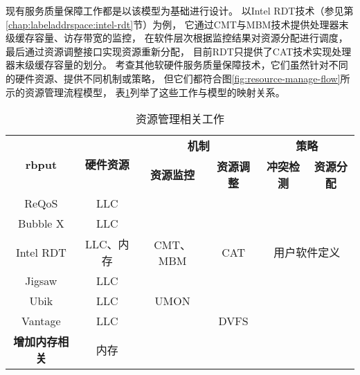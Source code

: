 
现有服务质量保障工作都是以该模型为基础进行设计。
以Intel RDT技术（参见第\ref{chap:labeladdrspace:intel-rdt}节）为例，
它通过CMT与MBM技术提供处理器末级缓存容量、访存带宽的监控，
在软件层次根据监控结果对资源分配进行调度，
最后通过资源调整接口实现资源重新分配，
目前RDT只提供了CAT技术实现处理器末级缓存容量的划分。
考查其他软硬件服务质量保障技术\cite{}，它们虽然针对不同的硬件资源、提供不同机制或策略，
但它们都符合图\ref{fig:resource-manage-flow}所示的资源管理流程模型，
表\ref{tab:resman-compare}列举了这些工作与模型的映射关系。


\begin{table}[htb]
  \centering
  \begin{minipage}[t]{0.95\linewidth}
  \caption{资源管理相关工作}
  \label{tab:resman-compare}
    \begin{tabular*}{\linewidth}{cccccc}
      \toprule[1.5pt]
      \multirow{2}{*}{\textbf{rbput}} & \multirow{2}{*}{\textbf{硬件资源}} & \multicolumn{2}{c}{\textbf{机制}}     & \multicolumn{2}{c}{\textbf{策略}}     \\
                                      &                                    & \textbf{资源监控} & \textbf{资源调整} & \textbf{冲突检测} & \textbf{资源分配} \\
      \midrule[1pt]
      ReQoS\cite{}                    & LLC                                &                   &                   &                   &                   \\
      Bubble X\cite{}                 & LLC                                &                   &                   &                   &                   \\
      \hline
      Intel RDT\cite{}                & LLC、内存                          & CMT、MBM          & CAT               & \multicolumn{2}{c}{用户软件定义}      \\
      Jigsaw\cite{}                   & LLC                                &                   &                   &                   &                   \\
      Ubik\cite{}                     & LLC                                & UMON              &                   &                   &                   \\
      Vantage\cite{}                  & LLC                                &                   & DVFS              &                   &                   \\
      \hline
      \textbf{增加内存相关}\cite{}    & 内存                               &                   &                   &                   &                   \\
      \bottomrule[1.5pt]
    \end{tabular*}\\[2pt]
  \end{minipage}
\end{table}


